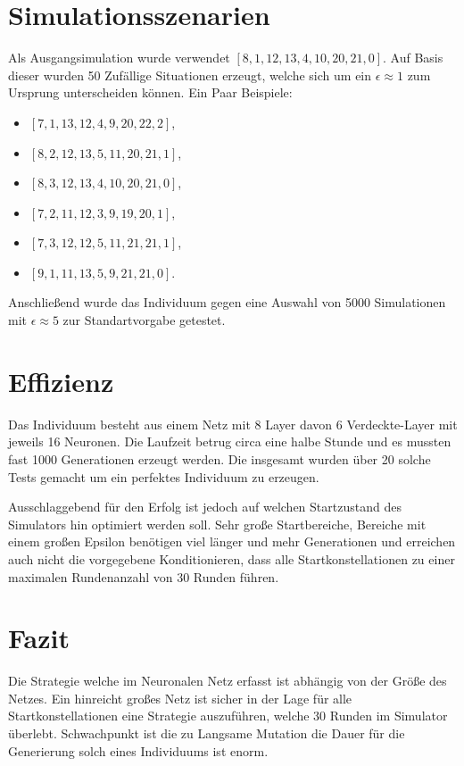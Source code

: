 \section{Simulationsszenarien}
Als Ausgangsimulation wurde verwendet \ensuremath{[8, 1, 12, 13, 4, 10, 20, 21, 0]}. Auf Basis dieser wurden 50 Zufällige Situationen erzeugt, welche sich um ein \ensuremath{\epsilon \approx 1}  zum Ursprung unterscheiden können. Ein Paar Beispiele: 
\begin{itemize}
\item\ensuremath{[7,	1,	13,	12,	4,	9,	20,	22,	2]},
\item\ensuremath{[8,	2,	12,	13,	5,	11,	20,	21,	1]},
\item\ensuremath{[8,	3,	12,	13,	4,	10,	20,	21,	0]},
\item\ensuremath{[7,	2,	11,	12,	3,	9,	19,	20,	1]},
\item\ensuremath{[7,	3,	12,	12,	5,	11,	21,	21,	1]},
\item\ensuremath{[9,	1,	11,	13,	5,	9,	21,	21,	0]}.
\end{itemize}

Anschließend wurde das Individuum gegen eine Auswahl von 5000 Simulationen mit \ensuremath{\epsilon \approx 5} zur Standartvorgabe getestet.

\section{Effizienz}
Das Individuum besteht aus einem Netz mit 8 Layer davon 6 Verdeckte-Layer mit jeweils 16 Neuronen. Die Laufzeit betrug circa eine halbe Stunde und es mussten fast 1000 Generationen erzeugt werden. Die insgesamt wurden über 20 solche Tests gemacht um ein perfektes Individuum zu erzeugen.

Ausschlaggebend für den Erfolg ist jedoch auf welchen Startzustand des Simulators hin optimiert werden soll. Sehr große Startbereiche, Bereiche mit einem großen Epsilon benötigen viel länger und mehr Generationen und erreichen auch nicht die vorgegebene Konditionieren, dass alle Startkonstellationen zu einer maximalen Rundenanzahl von 30 Runden führen.

\section{Fazit}
Die Strategie welche im Neuronalen Netz erfasst ist abhängig von der Größe des Netzes. Ein hinreicht großes Netz ist sicher in der Lage für alle Startkonstellationen eine Strategie auszuführen, welche 30 Runden im Simulator überlebt. Schwachpunkt ist die zu Langsame Mutation die Dauer für die Generierung solch eines Individuums ist enorm.

